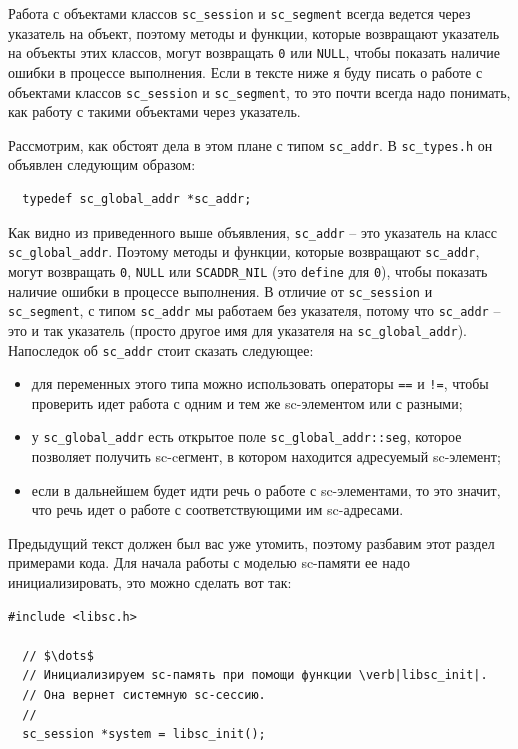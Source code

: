 Работа с объектами классов \lstinline{sc_session} и
\lstinline{sc_segment} всегда ведется через указатель на объект,
поэтому методы и функции, которые возвращают указатель на объекты этих
классов, могут возвращать \lstinline{0} или \lstinline{NULL}, чтобы
показать наличие ошибки в процессе выполнения. Если в тексте ниже я
буду писать о работе с объектами классов \lstinline{sc_session} и
\lstinline{sc_segment}, то это почти всегда надо понимать, как работу
с такими объектами через указатель.

Рассмотрим, как обстоят дела в этом плане с типом
\lstinline{sc_addr}. В \verb|sc_types.h| он объявлен следующим образом:
\begin{lstlisting}
  typedef sc_global_addr *sc_addr;
\end{lstlisting}

Как видно из приведенного выше объявления, \lstinline{sc_addr} – это
указатель на класс \lstinline{sc_global_addr}. Поэтому методы и
функции, которые возвращают \lstinline{sc_addr}, могут возвращать
\lstinline{0}, \lstinline{NULL} или \lstinline{SCADDR_NIL} (это
\lstinline{define} для \lstinline{0}), чтобы показать наличие ошибки в
процессе выполнения. В отличие от \lstinline{sc_session} и
\lstinline{sc_segment}, с типом \lstinline{sc_addr} мы работаем без
указателя, потому что \lstinline{sc_addr} – это и так указатель
(просто другое имя для указателя на
\lstinline{sc_global_addr}). Напоследок об \lstinline{sc_addr} стоит
сказать следующее:
\begin{itemize}
\item для переменных этого типа можно использовать операторы
  \lstinline{==} и \lstinline{!=}, чтобы проверить идет работа с одним
  и тем же sc-элементом или с разными;
\item у \lstinline{sc_global_addr} есть открытое поле
  \lstinline{sc_global_addr::seg}, которое позволяет получить
  sc-cегмент, в котором находится адресуемый sc-элемент;
\item если в дальнейшем будет идти речь о работе с sc-элементами, то
  это значит, что речь идет о работе с соответствующими им
  sc-адресами.
\end{itemize}

Предыдущий текст должен был вас уже утомить, поэтому разбавим этот
раздел примерами кода. Для начала работы с моделью sc-памяти ее надо
инициализировать, это можно сделать вот так:

\begin{lstlisting}[texcl]
  #include <libsc.h>

  // $\dots$
  // Инициализируем sc-память при помощи функции \verb|libsc_init|.
  // Она вернет системную sc-сессию.
  // 
  sc_session *system = libsc_init();
\end{lstlisting}

